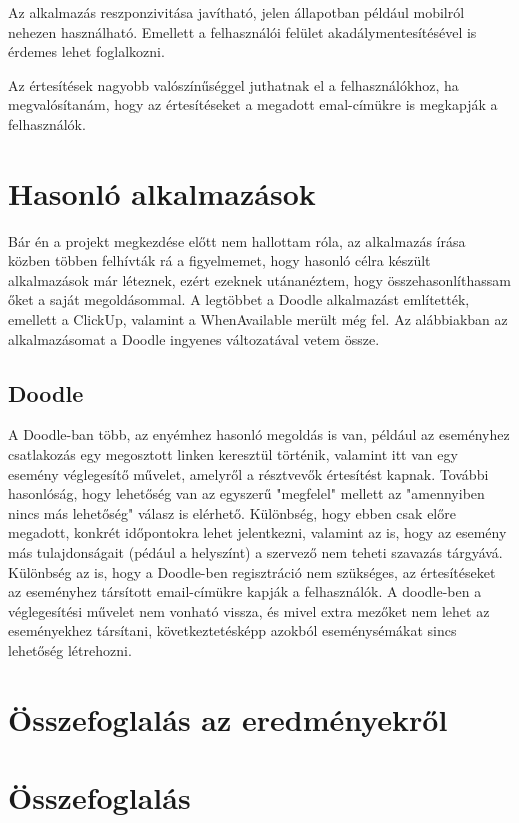 \documentclass[a4paper,12pt]{report}
\theoremstyle{definition}
\theoremstyle{remark}
\begin{document}
Az alkalmazás reszponzivitása javítható, jelen állapotban például mobilról nehezen használható. Emellett a felhasználói felület akadálymentesítésével is érdemes lehet foglalkozni.

Az értesítések nagyobb valószínűséggel juthatnak el a felhasználókhoz, ha megvalósítanám, hogy az értesítéseket a megadott emal-címükre is megkapják a felhasználók.

\chapter{Hasonló alkalmazások}

Bár én a projekt megkezdése előtt nem hallottam róla, az alkalmazás írása közben többen felhívták rá a figyelmemet, hogy hasonló célra készült alkalmazások már léteznek, ezért ezeknek utánanéztem, hogy összehasonlíthassam őket a saját megoldásommal. A legtöbbet a Doodle alkalmazást említették, emellett a ClickUp, valamint a WhenAvailable merült még fel. Az alábbiakban az alkalmazásomat a Doodle ingyenes változatával vetem össze.

\section{Doodle}

A Doodle-ban több, az enyémhez hasonló megoldás is van, például az eseményhez csatlakozás egy megosztott linken keresztül történik, valamint itt van egy esemény véglegesítő művelet, amelyről a résztvevők értesítést kapnak.  További hasonlóság, hogy lehetőség van az egyszerű "megfelel" mellett az "amennyiben nincs más lehetőség" válasz is elérhető. Különbség, hogy ebben csak előre megadott, konkrét időpontokra lehet jelentkezni, valamint az is, hogy az esemény más tulajdonságait (pédául a helyszínt) a szervező nem teheti szavazás tárgyává. Különbség az is, hogy a Doodle-ben regisztráció nem szükséges, az értesítéseket az eseményhez társított email-címükre kapják a felhasználók. A doodle-ben a véglegesítési művelet nem vonható vissza, és mivel extra mezőket nem lehet az eseményekhez társítani, következtetésképp azokból eseménysémákat sincs lehetőség létrehozni.

\chapter{Összefoglalás az eredményekről}

\chapter{Összefoglalás}
\end{document}
